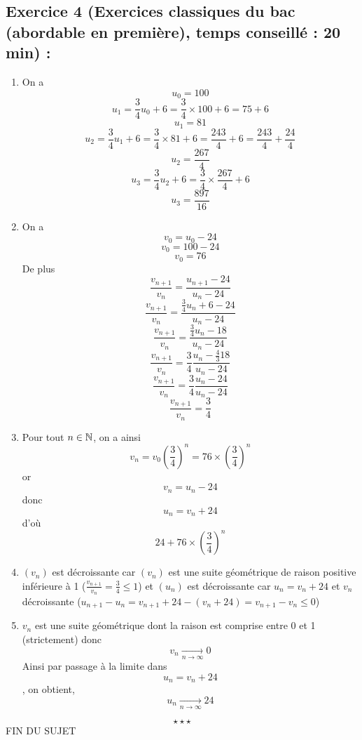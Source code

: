 \subsection*{Exercice 4 (Exercices classiques du bac (abordable en première), temps conseillé : 20 min) : }
\begin{enumerate}
\item On a $$\boxed{u_0 = 100}$$
$$u_1 =  \frac{3}{4}u_0 + 6 =  \frac{3}{4}\times 100 + 6 = 75 + 6$$
$$\boxed{u_1 = 81}$$
$$u_2 =  \frac{3}{4}u_1 + 6 =  \frac{3}{4}\times 81 + 6 = \frac{243}{4} + 6 = \frac{243}{4} + \frac{24}{4}$$
$$\boxed{u_2 = \frac{267}{4}}$$
$$u_3 =  \frac{3}{4}u_2 + 6 =  \frac{3}{4}\times \frac{267}{4} + 6$$
$$\boxed{u_3 = \frac{897}{16}}$$
\item On a $$v_0 = u_0 - 24$$
$$v_0 = 100 -24$$
$$\boxed{v_0 = 76}$$
De plus 
$$\frac{v_{n+1}}{v_n} = \frac{u_{n+1} - 24}{u_n -24}$$
$$\frac{v_{n+1}}{v_n} = \frac{\frac{3}{4}u_n + 6 -24}{u_n-24}$$
$$\frac{v_{n+1}}{v_n} = \frac{\frac{3}{4}u_n -18}{u_n-24}$$
$$\frac{v_{n+1}}{v_n} = \frac{3}{4}\frac{u_n -\frac{4}{3}18}{u_n-24}$$
$$\frac{v_{n+1}}{v_n} = \frac{3}{4}\frac{u_n -24}{u_n-24}$$
$$\boxed{\frac{v_{n+1}}{v_n} = \frac{3}{4}}$$
\item Pour tout $n\in \mathbb{N}$, on a ainsi 
$$v_n = v_0 \left(\frac{3}{4}\right)^n =  76 \times \left(\frac{3}{4}\right)^n$$
or 
$$v_n = u_n -24$$
donc 
$$u_n = v_n +24$$
d'où
$$\boxed{24 + 76 \times  \left(\frac{3}{4}\right)^n}$$
\item $(v_n)$ est décroissante car $(v_n)$ est une suite géométrique de raison positive inférieure à 1 ($\displaystyle \frac{v_{n+1}}{v_n} = \frac{3}{4}\leq 1$) et $(u_n)$ est décroissante car $u_n = v_n +24$ et $v_n$ décroissante ($u_{n+1} - u_n = v_{n+1} + 24 - (v_n +24) = v_{n+1} - v_n \leq 0$)
\item $v_n$ est une suite géométrique dont la raison est comprise entre 0 et 1 (strictement) donc $$v_n \underset{n\rightarrow \infty}{\longrightarrow} 0$$Ainsi par passage à la limite dans $$u_n = v_n +24$$, on obtient, $$\boxed{u_n \underset{n\rightarrow \infty}{\longrightarrow} 24}$$
\end{enumerate}
$$\star \star \star$$
\center
FIN DU SUJET
